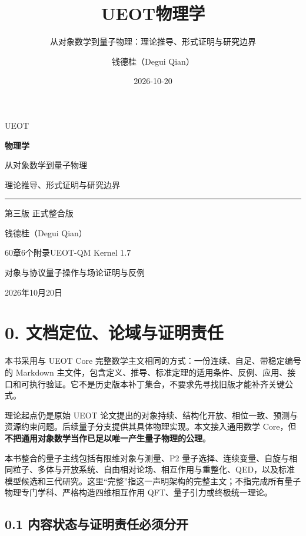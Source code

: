 \documentclass[
  11pt,
  oneside]{book}
\title{UEOT物理学}
\subtitle{从对象数学到量子物理：理论推导、形式证明与研究边界}
\author{钱德桂（Degui Qian）}
\date{2026-10-20}
\renewcommand{\maketitle}{
  \begin{titlepage}
  \thispagestyle{empty}
  \vspace*{30mm}
  {\color{teal}\fontsize{46}{52}\selectfont UEOT\par}
  \vspace{5mm}
  {\fontsize{32}{40}\selectfont\bfseries 物理学\par}
  \vspace{11mm}
  {\Large 从对象数学到量子物理\par}
  \vspace{4mm}
  {\large 理论推导、形式证明与研究边界\par}
  \vspace{10mm}
  {\color{teal}\rule{\textwidth}{1pt}\par}
  \vspace{7mm}
  {\large 第三版\quad 3.3 正式整合版\par}
  \vspace{6mm}
  {钱德桂（Degui Qian）\par}
  \vspace{5mm}
  {60章\quad 6个附录\quad UEOT-QM Kernel 1.7\par}
  \vfill
  {对象与协议\quad 量子操作与场论\quad 证明与反例\par}
  \vspace{7mm}
  {2026年10月20日\par}
  \end{titlepage}
}
\begin{document}
\frontmatter
\maketitle

{
\hypersetup{linkcolor=}
\setcounter{tocdepth}{0}
\tableofcontents
}
\mainmatter
\hypertarget{ch-0}{%
\chapter{0. 文档定位、论域与证明责任}\label{ch-0}}

本书采用与 UEOT Core
完整数学主文相同的方式：一份连续、自足、带稳定编号的 Markdown
主文件，包含定义、推导、标准定理的适用条件、反例、应用、接口和可执行验证。它不是历史版本补丁集合，不要求先寻找旧版才能补齐关键公式。

理论起点仍是原始 UEOT
论文提出的对象持续、结构化开放、相位一致、预测与资源约束问题。后续量子分支提供其具体物理实现。本文接入通用数学
Core，但\textbf{不把通用对象数学当作已足以唯一产生量子物理的公理}。

本书整合的量子主线包括有限维对象与测量、P2
量子选择、连续变量、自旋与相同粒子、多体与开放系统、自由相对论场、相互作用与重整化、QED，以及标准模型候选和三代研究。这里``完整''指这一声明架构的完整主文；不指完成所有量子物理专门学科、严格构造四维相互作用
QFT、量子引力或终极统一理论。

\hypertarget{ux5185ux5bb9ux72b6ux6001ux4e0eux8bc1ux660eux8d23ux4efbux5fc5ux987bux5206ux5f00}{%
\section{0.1
内容状态与证明责任必须分开}\label{ux5185ux5bb9ux72b6ux6001ux4e0eux8bc1ux660eux8d23ux4efbux5fc5ux987bux5206ux5f00}}
\end{document}
